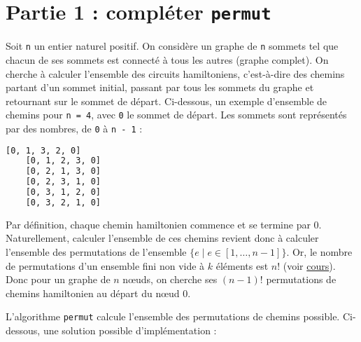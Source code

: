 
\section{\texorpdfstring{Partie 1 : compléter
\texttt{permut}}{Partie 1 : compléter permut}}\label{partie-1-compluxe9ter-permut}

Soit \texttt{n} un entier naturel positif. On considère un graphe de \texttt{n} sommets tel que chacun de ses sommets est connecté à tous les autres (graphe complet). On cherche à calculer l'ensemble des circuits
hamiltoniens, c'est-à-dire des chemins partant d'un sommet initial, passant par tous les sommets du graphe et retournant sur le sommet de départ. Ci-dessous, un exemple d'ensemble de chemins pour \texttt{n\ =\ 4}, avec \texttt{0} le sommet de départ. Les sommets sont représentés par des nombres, de \texttt{0} à \texttt{n - 1} :

\begin{lstlisting}[language=bash, caption={Ensemble de permutations possible d'un chemin hamiltonien pour $n = 4$}]
    [0, 1, 3, 2, 0] 
    [0, 1, 2, 3, 0]
    [0, 2, 1, 3, 0]
    [0, 2, 3, 1, 0]
    [0, 3, 1, 2, 0]
    [0, 3, 2, 1, 0]
\end{lstlisting}

Par définition, chaque chemin hamiltonien commence et se termine par $0$. Naturellement, calculer l'ensemble de ces chemins revient donc à calculer l'ensemble des permutations de l'ensemble $\{e \mid e \in [1, \ldots, n - 1]\}$. Or, le nombre de permutations d'un ensemble fini non vide à $k$ éléments est $n!$ (voir \href{https://www.lelivrescolaire.fr/page/12761882}{cours}). Donc pour un graphe de $n$ nœuds, on cherche ses $(n - 1)!$ permutations de chemins hamiltonien au départ du nœud $0$.

L'algorithme \texttt{permut} calcule l'ensemble des permutations de chemins possible. Ci-dessous, une solution possible d'implémentation :


